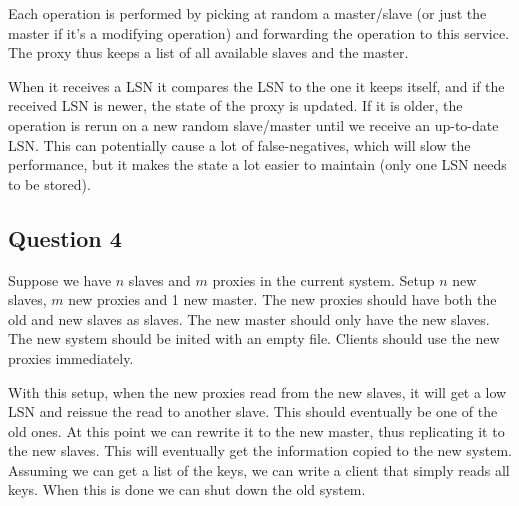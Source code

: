 \documentclass[a4paper,final]{article}
\newcommand{\mono}[1]{{\ttfamily#1}}
\begin{document}
Each operation is performed by picking at random a master/slave (or just the
master if it's a modifying operation) and forwarding the operation to this
service. The proxy thus keeps a list of all available slaves and the master.

When it receives a LSN it compares the LSN to the one it keeps itself, and if
the received LSN is newer, the state of the proxy is updated. If it is older,
the operation is rerun on a new random slave/master until we receive an
up-to-date LSN. This can potentially cause a lot of false-negatives, which
will slow the performance, but it makes the state a lot easier to maintain
(only one LSN needs to be stored).

\subsection*{Question 4}

Suppose we have $n$ slaves and $m$ proxies in the current system. Setup $n$ new
slaves, $m$ new proxies and 1 new master. The new proxies should have both the
old and new slaves as slaves. The new master should only have the new slaves.
The new system should be \mono{init}ed with an empty file. Clients should use
the new proxies immediately.

With this setup, when the new proxies read from the new slaves, it will get a
low LSN and reissue the read to another slave. This should eventually be one of
the old ones. At this point we can rewrite it to the new master, thus
replicating it to the new slaves. This will eventually get the information
copied to the new system. Assuming we can get a list of the keys, we can write
a client that simply reads all keys. When this is done we can shut down the old
system.

\end{document}
